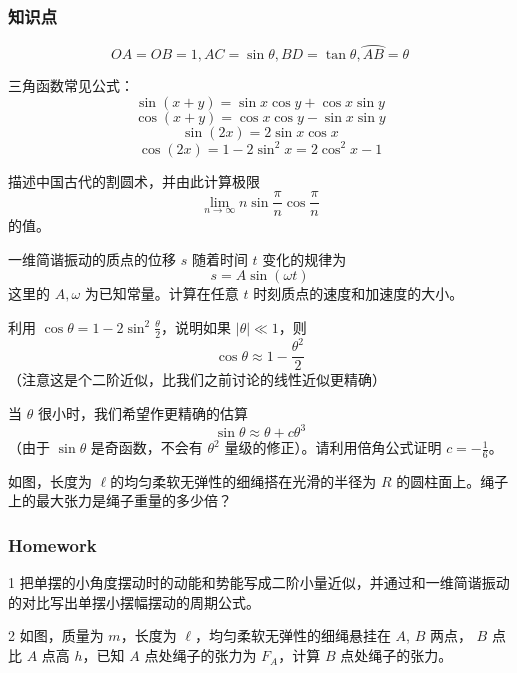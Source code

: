 \documentclass[CJK,13pt]{beamer}
\begin{document}
\begin{frame}
  \frametitle{知识点}


$$OA=OB=1, AC = \sin\theta, BD = \tan\theta, \wideparen{AB} = \theta$$
\end{frame}


\begin{frame}
  
  三角函数常见公式：
  $$\sin(x+y) = \sin x \cos y + \cos x \sin y $$
  $$\cos(x+y) = \cos x \cos y - \sin x \sin y $$  
  $$\sin(2x) = 2\sin x \cos x$$
  $$\cos(2x) = 1-2\sin^2x = 2\cos^2x -1 $$

\end{frame}


\begin{frame}
  描述中国古代的割圆术，并由此计算极限
  $$\lim_{n\rightarrow \infty} n \sin\frac{\pi}{n}\cos\frac{\pi}{n} $$
  的值。


\end{frame}


\begin{frame}
  一维简谐振动的质点的位移 $s$ 随着时间 $t$ 变化的规律为
  $$s = A\sin{(\omega t)}$$
  这里的 $A,\omega$ 为已知常量。计算在任意 $t$ 时刻质点的速度和加速度的大小。
\end{frame}

\begin{frame}
  利用 $\cos\theta = 1-2\sin^2\frac{\theta}{2}$，说明如果 $|\theta|\ll 1$，则
  $$\cos\theta \approx 1- \frac{\theta^2}{2}$$
  （注意这是个二阶近似，比我们之前讨论的线性近似更精确）
\end{frame}  

\begin{frame}
  当 $\theta$ 很小时，我们希望作更精确的估算
  $$ \sin \theta \approx \theta + c\theta^3 $$
  （由于 $\sin \theta$ 是奇函数，不会有 $\theta^2$ 量级的修正）。请利用倍角公式证明 $c=-\frac{1}{6}$。
\end{frame}



\begin{frame}

  如图，长度为 $\ell$的均匀柔软无弹性的细绳搭在光滑的半径为 $R$ 的圆柱面上。绳子上的最大张力是绳子重量的多少倍？
  
\end{frame}



\begin{frame}
  \frametitle{Homework}
  \bitem
\item[1]{把单摆的小角度摆动时的动能和势能写成二阶小量近似，并通过和一维简谐振动的对比写出单摆小摆幅摆动的周期公式。}
\item[2]{如图，质量为 $m$，长度为 $\ell$，均匀柔软无弹性的细绳悬挂在 $A$, $B$ 两点， $B$ 点比 $A$ 点高 $h$，已知 $A$ 点处绳子的张力为 $F_A$，计算 $B$ 点处绳子的张力。
   }
  \eitem
\end{frame}

\ech
\end{document}
